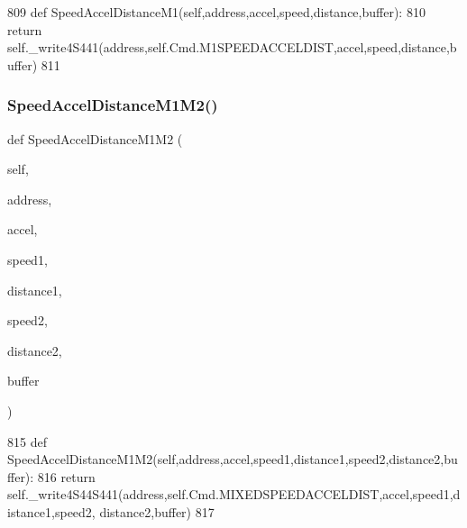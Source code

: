 \begin{DoxyCode}
809     \textcolor{keyword}{def }SpeedAccelDistanceM1(self,address,accel,speed,distance,buffer):
810         \textcolor{keywordflow}{return} self.\_write4S441(address,self.Cmd.M1SPEEDACCELDIST,accel,speed,distance,buffer)
811 
\end{DoxyCode}
\mbox{\label{classtoxic__hardware_1_1roboclaw__3_1_1Roboclaw_ac2b210f5288d22c653c019bd60ee7fda}} 
\subsubsection{\texorpdfstring{Speed\+Accel\+Distance\+M1\+M2()}{SpeedAccelDistanceM1M2()}}
{\footnotesize\ttfamily def Speed\+Accel\+Distance\+M1\+M2 (\begin{DoxyParamCaption}\item[{}]{self,  }\item[{}]{address,  }\item[{}]{accel,  }\item[{}]{speed1,  }\item[{}]{distance1,  }\item[{}]{speed2,  }\item[{}]{distance2,  }\item[{}]{buffer }\end{DoxyParamCaption})}


\begin{DoxyCode}
815     \textcolor{keyword}{def }SpeedAccelDistanceM1M2(self,address,accel,speed1,distance1,speed2,distance2,buffer):
816         \textcolor{keywordflow}{return} self.\_write4S44S441(address,self.Cmd.MIXEDSPEEDACCELDIST,accel,speed1,distance1,speed2,
      distance2,buffer)
817 
\end{DoxyCode}
\mbox{\label{classtoxic__hardware_1_1roboclaw__3_1_1Roboclaw_a2cf733613d498449053cbb0ddc964205}} 
